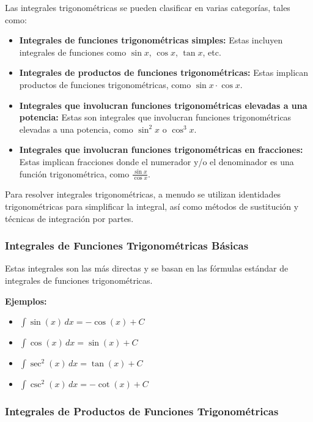 Las integrales trigonométricas se pueden clasificar en varias categorías, tales como:

\begin{itemize}
    \item \textbf{Integrales de funciones trigonométricas simples:} Estas incluyen integrales de funciones como \( \sin x \), \( \cos x \), \( \tan x \), etc.
    \item \textbf{Integrales de productos de funciones trigonométricas:} Estas implican productos de funciones trigonométricas, como \( \sin x \cdot \cos x \).
    \item \textbf{Integrales que involucran funciones trigonométricas elevadas a una potencia:} Estas son integrales que involucran funciones trigonométricas elevadas a una potencia, como \( \sin^2 x \) o \( \cos^3 x \).
    \item \textbf{Integrales que involucran funciones trigonométricas en fracciones:} Estas implican fracciones donde el numerador y/o el denominador es una función trigonométrica, como \( \frac{\sin x}{\cos x} \).
\end{itemize}

Para resolver integrales trigonométricas, a menudo se utilizan identidades trigonométricas para simplificar la integral, así como métodos de sustitución y técnicas de integración por partes.

\subsubsection{Integrales de Funciones Trigonométricas Básicas}

Estas integrales son las más directas y se basan en las fórmulas estándar de integrales de funciones trigonométricas.

\textbf{Ejemplos:}

\begin{itemize}
  \item \(\int \sin(x) \, dx = -\cos(x) + C\)
  \item \(\int \cos(x) \, dx = \sin(x) + C\)
  \item \(\int \sec^2(x) \, dx = \tan(x) + C\)
  \item \(\int \csc^2(x) \, dx = -\cot(x) + C\)
\end{itemize}

\subsubsection{Integrales de Productos de Funciones Trigonométricas}


